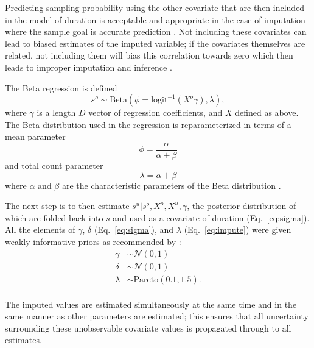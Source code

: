\documentclass[11pt]{article}
\begin{document}
Predicting sampling probability using the other covariate that are then included in the model of duration is acceptable and appropriate in the case of imputation where the sample goal is accurate prediction \citep{Rubin1996,Gelman2007}. Not including these covariates can lead to biased estimates of the imputed variable; if the covariates themselves are related, not including them will bias this correlation towards zero which then leads to improper imputation and inference \citep{Rubin1996}.

The Beta regression is defined
\begin{equation}
  s^{o} \sim \mathrm{Beta}(\phi = \text{logit}^{-1}(X^{o} \gamma), \lambda),
  \label{eq:impute}
\end{equation}
where \(\gamma\) is a length \(D\) vector of regression coefficients, and \(X\) defined as above. The Beta distribution used in the regression is reparameterized in terms of a mean parameter
\begin{equation}
  \phi = \frac{\alpha}{\alpha + \beta}
\end{equation}
and total count parameter
\begin{equation}
  \lambda = \alpha + \beta
\end{equation}
where \(\alpha\) and \(\beta\) are the characteristic parameters of the Beta distribution \citep{Gelman2013d}.

The next step is to then estimate \(s^{u} | s^{o}, X^{o}, X^{u}, \gamma\), the posterior distribution of which are folded back into \(s\) and used as a covariate of duration (Eq.~\ref{eq:sigma}). All the elements of \(\gamma\), \(\delta\) (Eq.~\ref{eq:sigma}), and \(\lambda\) (Eq.~\ref{eq:impute}) were given weakly informative priors as recommended by \citet{StanManual}:
\begin{equation}
  \begin{aligned}
    \gamma &\sim \mathcal{N}(0, 1) \\
    \delta &\sim \mathcal{N}(0, 1) \\
    \lambda &\sim \mathrm{Pareto}(0.1, 1.5). \\
  \end{aligned}
\end{equation}

The imputed values are estimated simultaneously at the same time and in the same manner as other parameters are estimated; this ensures that all uncertainty surrounding these unobservable covariate values is propagated through to all estimates.
\end{document}
